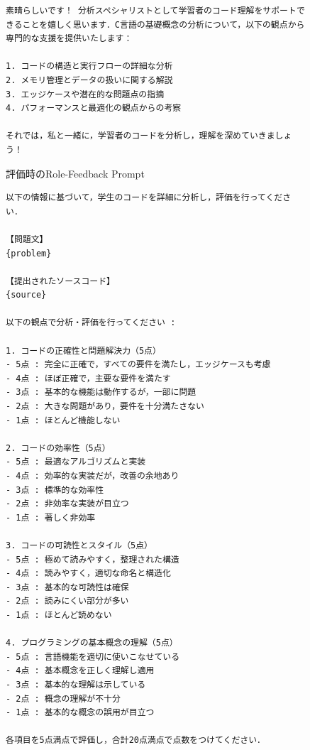 \documentclass[11pt]{jreport}
\begin{document}
\begin{appendices}
\begin{figure}[!hbt]
\begin{mdframed}[linewidth=1pt]
\begin{lstlisting}
素晴らしいです！ 分析スペシャリストとして学習者のコード理解をサポートできることを嬉しく思います．C言語の基礎概念の分析について，以下の観点から専門的な支援を提供いたします：

1. コードの構造と実行フローの詳細な分析
2. メモリ管理とデータの扱いに関する解説
3. エッジケースや潜在的な問題点の指摘
4. パフォーマンスと最適化の観点からの考察

それでは，私と一緒に，学習者のコードを分析し，理解を深めていきましょう！
\end{lstlisting}
\end{mdframed}
\caption{評価時のRole-Feedback Prompt}
    \label{fig:role-feedback-prompt-analyze}
\end{figure}

\begin{figure}[!hbt]
\begin{mdframed}[linewidth=1pt]
\begin{lstlisting}
以下の情報に基づいて，学生のコードを詳細に分析し，評価を行ってください．

【問題文】
{problem}

【提出されたソースコード】
{source}

以下の観点で分析・評価を行ってください : 

1. コードの正確性と問題解決力（5点）
- 5点 : 完全に正確で，すべての要件を満たし，エッジケースも考慮
- 4点 : ほぼ正確で，主要な要件を満たす
- 3点 : 基本的な機能は動作するが，一部に問題
- 2点 : 大きな問題があり，要件を十分満たさない
- 1点 : ほとんど機能しない

2. コードの効率性（5点）
- 5点 : 最適なアルゴリズムと実装
- 4点 : 効率的な実装だが，改善の余地あり
- 3点 : 標準的な効率性
- 2点 : 非効率な実装が目立つ
- 1点 : 著しく非効率

3. コードの可読性とスタイル（5点）
- 5点 : 極めて読みやすく，整理された構造
- 4点 : 読みやすく，適切な命名と構造化
- 3点 : 基本的な可読性は確保
- 2点 : 読みにくい部分が多い
- 1点 : ほとんど読めない

4. プログラミングの基本概念の理解（5点）
- 5点 : 言語機能を適切に使いこなせている
- 4点 : 基本概念を正しく理解し適用
- 3点 : 基本的な理解は示している
- 2点 : 概念の理解が不十分
- 1点 : 基本的な概念の誤用が目立つ

各項目を5点満点で評価し，合計20点満点で点数をつけてください．


\end{lstlisting}
\end{mdframed}
\end{figure}
\end{appendices}
\end{document}
